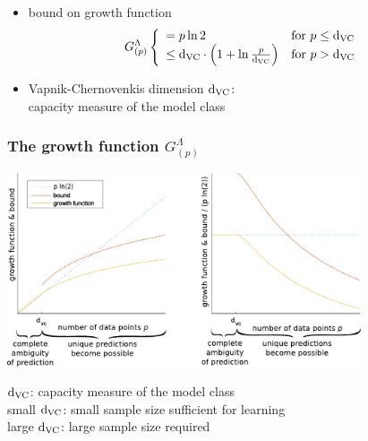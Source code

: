 \begin{frame}
	\begin{itemize}
		\item bound on growth function \cite{Vapnik1998}
			\begin{equation}
				G_{(p)}^\Lambda
				\left \{ \begin{array}{ll}
					= p \ln 2 
					& \text{for } p \leq \mathrm{d}_{\mathrm{VC}} \\
					\leq \mathrm{d}_{\mathrm{VC}} \cdot \Big( 1 + \ln \frac{p}{\mathrm{d}_{\mathrm{VC}}} \Big) 
					& \text{for } p > \mathrm{d}_{\mathrm{VC}}
				\end{array} \right.
			\label{eq:growthpiecewise}
			\end{equation}

		\item Vapnik-Chernovenkis dimension $\mathrm{d}_{\mathrm{VC}}$: \\
			capacity measure of the model class
	\end{itemize}
\end{frame}

\begin{frame}\frametitle{The growth function $G_{(p)}^\Lambda$}
	\begin{center}
		\includegraphics[height=5.7cm]{img/growth_function_clean}
	\end{center}
	\vspace{-2mm}
	$\mathrm{d}_{\mathrm{VC}}$: capacity measure of the model class\\
	small $\mathrm{d}_{\mathrm{VC}}$: small sample size sufficient for learning\\
	large $\mathrm{d}_{\mathrm{VC}}$: large sample size required

\end{frame}



